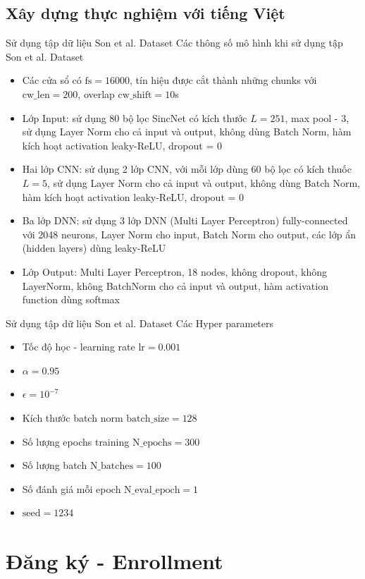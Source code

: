 \documentclass[notheorems, aspectratio=54]{beamer}
\begin{document}
\subsection{Xây dựng thực nghiệm với \textbf{tiếng Việt}}
\begin{frame}{Sử dụng tập dữ liệu Son et al. Dataset}
	Các thông số mô hình khi sử dụng tập Son et al. Dataset
	\begin{itemize}
		\item Các cửa sổ có $\text{fs} = 16000$, tín hiệu được cắt thành những chunks với $\text{cw\_len}=200$, overlap $\text{cw\_shift}=10$s
		\item Lớp Input: sử dụng 80 bộ lọc SincNet có kích thước $L=251$, max pool - 3, sử dụng Layer Norm cho cả input và output, không dùng Batch Norm, hàm kích hoạt activation leaky-ReLU, dropout = 0
		\item Hai lớp CNN: sử dụng 2 lớp CNN, với mỗi lớp dùng 60 bộ lọc có kích thuốc $L=5$, sử dụng Layer Norm cho cả input và output, không dùng Batch Norm, hàm kích hoạt activation leaky-ReLU, dropout = 0
		\item Ba lớp DNN: sử dụng 3 lớp DNN (Multi Layer Perceptron) fully-connected với 2048 neurons, Layer Norm cho input, Batch Norm cho output, các lớp ẩn (hidden layers) dùng leaky-ReLU
		\item Lớp Output: Multi Layer Perceptron, 18 nodes, không dropout, không LayerNorm, không BatchNorm cho cả input và output, hàm activation function dùng softmax
	\end{itemize}
\end{frame}
\begin{frame}{Sử dụng tập dữ liệu Son et al. Dataset}
	Các Hyper parameters
	\begin{itemize}
		\item Tốc độ học - learning rate $\text{lr} = 0.001$
		\item $\alpha = 0.95$
		\item $\epsilon = 10^{-7}$
		\item Kích thước batch norm $\text{batch\_size}=128$
		\item Số lượng epochs training $\text{N\_epochs}=300$
		\item Số lượng batch $\text{N\_batches}=100$
		\item Số đánh giá mỗi epoch $\text{N\_eval\_epoch}=1$
		\item $\text{seed}=1234$
	\end{itemize}
\end{frame}
\section{Đăng ký - Enrollment}
\end{document}
